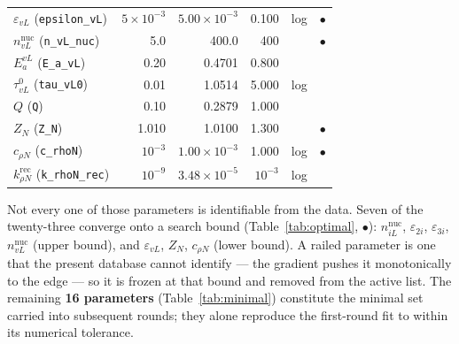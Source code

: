 \documentclass{article}
\begin{document}
\begin{table}[h!]
\begin{tabular}{l r r r c c}
$\varepsilon_{vL}$ (\texttt{epsilon\_vL})      & $5\times10^{-3}$ & $5.00\times10^{-3}$ & 0.100 & log & $\bullet$\\
$n_{vL}^{\mathrm{nuc}}$ (\texttt{n\_vL\_nuc})  & 5.0 & 400.0 & 400 & & $\bullet$\\
$E^{vL}_a$ (\texttt{E\_a\_vL})                 & 0.20 & 0.4701 & 0.800 & & \\
$\tau^0_{vL}$ (\texttt{tau\_vL0})              & 0.01 & 1.0514 & 5.000 & log & \\
$Q$ (\texttt{Q})                               & 0.10 & 0.2879 & 1.000 & & \\
$Z_N$ (\texttt{Z\_N})                          & 1.010 & 1.0100 & 1.300 & & $\bullet$\\
$c_{\rho N}$ (\texttt{c\_rhoN})                & $10^{-3}$ & $1.00\times10^{-3}$ & 1.000 & log & $\bullet$\\
$k^{\mathrm{rec}}_{\rho N}$ (\texttt{k\_rhoN\_rec}) & $10^{-9}$ & $3.48\times10^{-5}$ & $10^{-3}$ & log & \\
\hline
\end{tabular}
\end{table}

Not every one of those parameters is identifiable from the data. Seven of the
twenty-three converge onto a search bound
(Table~\ref{tab:optimal}, $\bullet$): $n_{iL}^{\mathrm{nuc}}$,
$\varepsilon_{2i}$, $\varepsilon_{3i}$, $n_{vL}^{\mathrm{nuc}}$ (upper bound),
and $\varepsilon_{vL}$, $Z_N$, $c_{\rho N}$ (lower bound). A railed parameter is
one that the present database cannot identify — the gradient pushes it monotonically
to the edge — so it is frozen at that bound and removed from the active list.
The remaining \textbf{16 parameters} (Table~\ref{tab:minimal}) constitute the
minimal set carried into subsequent rounds; they alone reproduce the first-round
fit to within its numerical tolerance.
\end{document}
